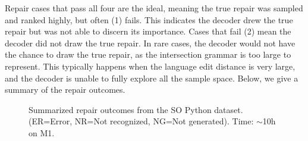 \noindent Repair cases that pass all four are the ideal, meaning the true repair was sampled and ranked highly, but often (1) fails. This indicates the decoder drew the true repair but was not able to discern its importance. Cases that fail (2) mean the decoder did not draw the true repair. In rare cases, the decoder would not have the chance to draw the true repair, as the intersection grammar is too large to represent. This typically happens when the language edit distance is very large, and the decoder is unable to fully explore all the sample space. Below, we give a summary of the repair outcomes.

\begin{figure}[H]
\begin{center}
\resizebox{.73\textwidth}{!}{}
\caption{Summarized repair outcomes from the SO Python dataset. (ER=Error, NR=Not recognized, NG=Not generated). Time: $\sim$10h on M1.}
\end{center}
\end{figure}
